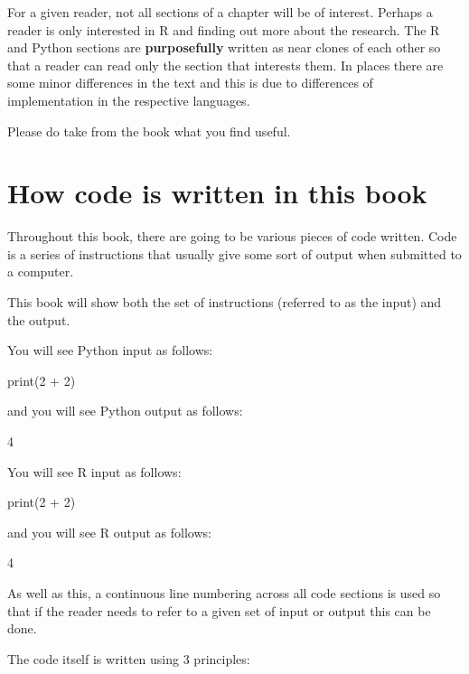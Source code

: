 For a given reader, not all sections of a chapter will be of interest.
Perhaps a reader is only interested in R and finding out more about the
research.
The R and Python sections are \textbf{purposefully} written as near clones of
each other so that a reader can read only the section that interests them.
In places there are some minor differences in the text and this is due to
differences of implementation in the respective languages.

Please do take from the book what you find useful.

\section{How code is written in this book}\label{sec:how-to-get-the-most-out-of-this-book}

Throughout this book, there are going to be various pieces of code written. Code
is a series of instructions that usually give some sort of output when submitted
to a computer.

This book will show both the set of instructions (referred to as the input) and
the output.

You will see Python input as follows:

\begin{pyin}
print(2 + 2)
\end{pyin}

and you will see Python output as follows:

\begin{pyout}
4
\end{pyout}

You will see R input as follows:

\begin{Rin}
print(2 + 2)
\end{Rin}

and you will see R output as follows:

\begin{Rout}
[1] 4
\end{Rout}

As well as this, a continuous line numbering across all code sections is used so
that if the reader needs to refer to a given set of input or output this can be
done.

The code itself is written using 3 principles:

